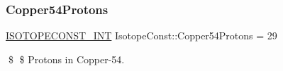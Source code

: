 \subsubsection{\texorpdfstring{Copper54\+Protons}{Copper54Protons}}
{\footnotesize\ttfamily \mbox{\hyperlink{group___isotope_const-_macros_ga5f18360b3e99483a35c32d789e62621c}{I\+S\+O\+T\+O\+P\+E\+C\+O\+N\+S\+T\+\_\+\+I\+NT}} Isotope\+Const\+::\+Copper54\+Protons = 29}

\$ \$ Protons in Copper-\/54. 